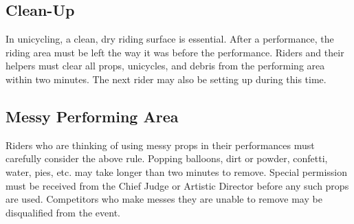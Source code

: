 \subsection{Clean-Up}
In unicycling, a clean, dry riding surface is essential.
After a performance, the riding area must be left the way it was before the performance.
Riders and their helpers must clear all props, unicycles, and debris from the performing area within two minutes.
The next rider may also be setting up during this time.

\subsection{Messy Performing Area}
Riders who are thinking of using messy props in their performances must carefully consider the above rule.
Popping balloons, dirt or powder, confetti, water, pies, etc.
may take longer than two minutes to remove.
Special permission must be received from the Chief Judge or Artistic Director before any such props are used.
Competitors who make messes they are unable to remove may be disqualified from the event.
